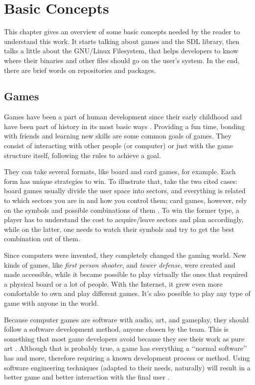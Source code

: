 \chapter{Basic Concepts}
\label {sec:basic_concepts}

This chapter gives an overview of some basic concepts needed by the reader to understand this work. It starts talking about games and the SDL library, then talks a little about the GNU/Linux Filesystem, that helps developers to know where their binaries and other files should go on the user's system. In the end, there are brief words on repositories and packages.

\section{Games}
\label {sec:games}

Games have been a part of human development since their early childhood and have been part of history in its most basic ways \cite{bethke2003game}. Providing a fun time, bonding with friends and learning new skills are some common goals of games. They consist of interacting with other people (or computer) or just with the game structure itself, following the rules to achieve a goal.

They can take several formats, like board and card games, for example. Each form has unique strategies to win. To illustrate that, take the two cited cases: board games usually divide the user space into sectors, and everything is related to which sectors you are in and how you control them; card games, however, rely on the symbols and possible combinations of them \cite{crawford1984art}. To win the former type, a player has to understand the cost to acquire/leave sectors and plan accordingly, while on the latter, one needs to watch their symbols and try to get the best combination out of them.

Since computers were invented, they completely changed the gaming world. New kinds of games, like \textit{first person shooter}, and \textit{tower defense}, were created and made accessible, while it became possible to play virtually the ones that required a physical board or a lot of people. With the Internet, it grew even more comfortable to own and play different games. It's also possible to play any type of game with anyone in the world.

Because computer games are software with audio, art, and gameplay, they should follow a software development method, anyone chosen by the team. This is something that most game developers avoid because they see their work as pure art \cite{bethke2003game}. Although that is probably true, a game has everything a \lq\lq normal software\rq\rq{} has and more, therefore requiring a known development process or method. Using software engineering techniques (adapted to their needs, naturally) will result in a better game and better interaction with the final user \cite{pressman2009software}.


